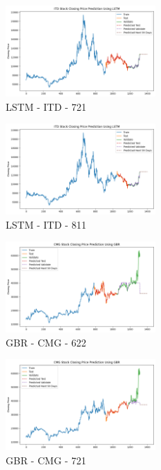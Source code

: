 \documentclass{ieeeojies}
\begin{document}
\begin{figure} [H]
    \centering
    \includegraphics[width=0.5\textwidth]{bibliography/Figure/LSTM_ITD_721_90.png}
    \caption{LSTM - ITD - 721}
    \label{fig:LSTM_ITD_721_90}
\end{figure}
\begin{figure} [H]
    \centering
    \includegraphics[width=0.5\textwidth]{bibliography/Figure/LSTM_ITD_811_90.png}
    \caption{LSTM - ITD - 811}
    \label{fig:LSTM_ITD_811_90}
\end{figure}
\begin{figure} [H]
    \centering
    \includegraphics[width=0.5\textwidth]{bibliography/Figure/GBR_CMG_622_90.png}
    \caption{GBR - CMG - 622}
    \label{fig:GBR_CMG_622_90}
\end{figure}
\begin{figure} [H]
    \centering
    \includegraphics[width=0.5\textwidth]{bibliography/Figure/GBR_CMG_721_90.png}
    \caption{GBR - CMG - 721}
    \label{fig:GBR_CMG_721_90}
\end{figure}
\end{document}
